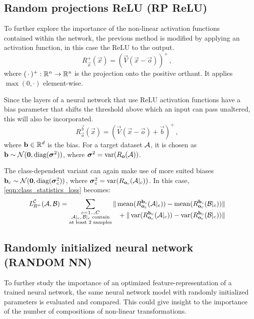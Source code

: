 \subsection{Random projections ReLU (RP ReLU)}
To further explore the importance of the non-linear activation functions contained within the network,
the previous method is modified by applying an activation function, in this case the ReLU to the output.
% 
\[
    R_{\vec o}^+ (\vec x) = (\vec V (\vec x - \vec o))^+ \,,
\]
where $(\,\cdot\,)^+ :\R^n \to \R^n$ is the projection onto the positive orthant. It applies $\max(0, \cdot)$ element-wise.

Since the layers of a neural network that use ReLU activation functions have a bias parameter that shifts the threshold above which an input can pass unaltered, this will also be incorporated.
\[
    R_{\vec o}^{\vec b} (\vec x) = (\vec V (\vec x - \vec o) + \vec b)^+ \,,
\]
where $\vec b \in \R^d$ is the bias. For a target dataset $\set A$, it is chosen as $\vec b \sim \mathcal N(\vec 0, \textnormal{diag}(\boldsymbol \sigma ^2))$, 
where $\boldsymbol \sigma ^2 = \var ({R_{\vec o}(\set A)})$.

The class-dependent variant can again make use of more suited biases $\vec b_c \sim \mathcal N( \vec 0, \textnormal{diag}(\boldsymbol \sigma _c^2))$, 
where $\boldsymbol \sigma_c ^2 = \var ({R_{\vec o_c}(\set A|_c)})$.
In this case, \cref{eqn:class_statistics_loss} becomes:
% 
\begin{equation*}
    \loss _{R^+} ^{\mathcal C} (\set A, \set B) =
    \sum _{\substack{c = 1 \dots C \\ \set A|_c,\, \set B|_c \text{ contain} \\ \text{at least 2 samples}}}
    \begin{alignedat}[t]{1}
        \|\mean ({R_{\vec o_c}^{\vec b_c} (\set A|_c)}) - \mean ({R_{\vec o_c}^{\vec b_c} (\set B|_c)}) &\| \\
        {} + \|\var ({R_{\vec o_c}^{\vec b_c} (\set A|_c)}) - \var ({R_{\vec o_c}^{\vec b_c} (\set B|_c)}) &\| 
    \end{alignedat}
\end{equation*}

\subsection{Randomly initialized neural network (RANDOM NN)}
To further study the importance of an optimized feature-representation of a trained neural network, 
the same neural network model with randomly initialized parameters is evaluated and compared.
This could give insight to the importance of the number of compositions of non-linear transformations.

